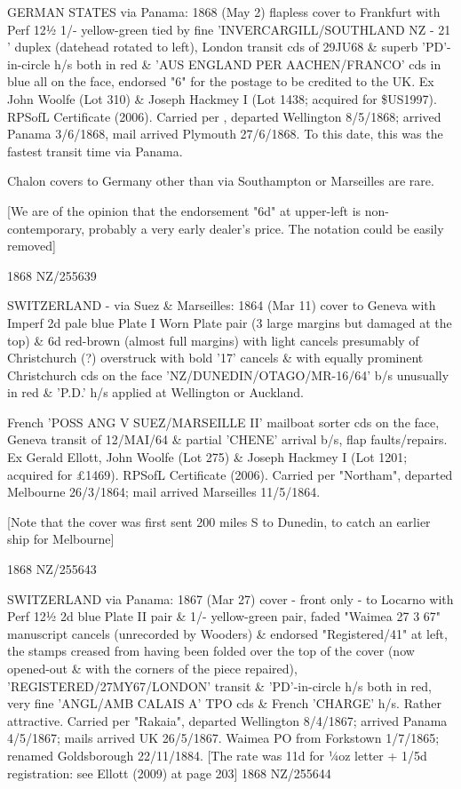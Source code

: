 \documentclass[justified]{tufte-book}
\begin{document}
%
{GERMAN STATES via Panama: 1868 (May 2) flapless cover to Frankfurt with Perf 12½ 1/- yellow-green tied by fine 'INVERCARGILL/SOUTHLAND NZ - 21 ' duplex (datehead rotated to left), London transit cds of 29JU68 \& superb 'PD'-in-circle h/s both in red \& 'AUS ENGLAND PER AACHEN/FRANCO' cds in blue all on the face, endorsed "6" for the postage to be credited to the UK. Ex John Woolfe (Lot 310) \& Joseph Hackmey I (Lot 1438; acquired for \$US1997). RPSofL Certificate (2006). Carried per , departed Wellington 8/5/1868; arrived Panama 3/6/1868, mail arrived Plymouth 27/6/1868. To this date, this was the fastest transit time via Panama. 

Chalon covers to Germany other than via Southampton or Marseilles are rare. 

[We are of the opinion that the endorsement "6d" at upper-left is non-contemporary, probably a very early dealer's price. The notation could be easily removed] }%
{1868}%
{NZ/255639}%
{}%
{}
{}%
{}

%
{SWITZERLAND - via Suez \& Marseilles: 1864 (Mar 11) cover to Geneva with Imperf 2d pale blue Plate I Worn Plate pair (3 large margins but damaged at the top) \& 6d red-brown (almost full margins) with light cancels presumably of Christchurch (?) overstruck with bold '17' cancels \& with equally prominent Christchurch cds on the face 'NZ/DUNEDIN/OTAGO/MR-16/64' b/s unusually in red \& 'P.D.' h/s applied at Wellington or Auckland.

French 'POSS ANG V SUEZ/MARSEILLE II' mailboat sorter cds on the face, Geneva transit of 12/MAI/64 \& partial 'CHENE' arrival b/s, flap faults/repairs. Ex Gerald Ellott, John Woolfe (Lot 275) \& Joseph Hackmey I (Lot 1201; acquired for £1469). RPSofL Certificate (2006). Carried per "Northam", departed Melbourne 26/3/1864; mail arrived Marseilles 11/5/1864. 

[Note that the cover was first sent 200 miles S to Dunedin, to catch an earlier ship for Melbourne]}%
{1868}%
{NZ/255643}%
{}%
{}
{}%
{}


%
{SWITZERLAND via Panama: 1867 (Mar 27) cover - front only - to Locarno with Perf 12½ 2d blue Plate II pair \& 1/- yellow-green pair, faded "Waimea 27 3 67" manuscript cancels (unrecorded by Wooders) \& endorsed "Registered/41" at left, the stamps creased from having been folded over the top of the cover (now opened-out \& with the corners of the piece repaired), 'REGISTERED/27MY67/LONDON' transit \& 'PD'-in-circle h/s both in red, very fine 'ANGL/AMB CALAIS A' TPO cds \& French 'CHARGE' h/s. Rather attractive. Carried per "Rakaia", departed Wellington 8/4/1867; arrived Panama 4/5/1867; mails arrived UK 26/5/1867. Waimea PO from Forkstown 1/7/1865; renamed Goldsborough 22/11/1884. [The rate was 11d for ¼oz letter + 1/5d registration: see Ellott (2009) at page 203]}%
{1868}%
{NZ/255644}%
{}%
{}
{}%
{}
\end{document}

